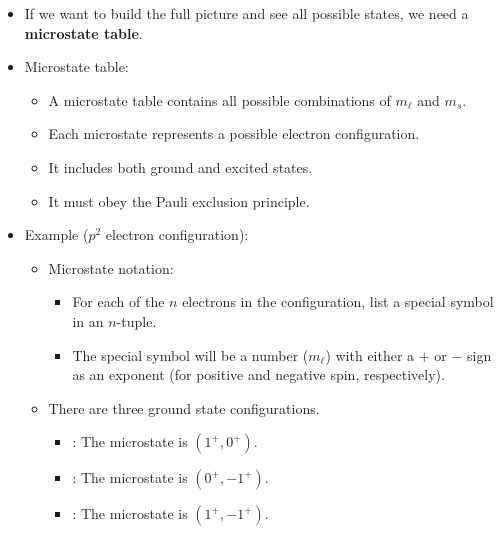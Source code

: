 \documentclass[../notes.tex]{subfiles}
\begin{document}
\begin{itemize}
\begin{itemize}
    \end{itemize}
    \item If we want to build the full picture and see all possible states, we need a \textbf{microstate table}.
    \item Microstate table:
    \begin{itemize}
        \item A microstate table contains all possible combinations of $m_\ell$ and $m_s$.
        \item Each microstate represents a possible electron configuration.
        \item It includes both ground and excited states.
        \item It must obey the Pauli exclusion principle.
    \end{itemize}
    \item Example ($p^2$ electron configuration):
    \begin{itemize}
        \item Microstate notation:
        \begin{itemize}
            \item For each of the $n$ electrons in the configuration, list a special symbol in an $n$-tuple.
            \item The special symbol will be a number ($m_\ell$) with either a $+$ or $-$ sign as an exponent (for positive and negative spin, respectively).
        \end{itemize}
        \item There are three ground state configurations.
        \begin{itemize}
            \item {}: The microstate is $(1^+,0^+)$.
            \item {}: The microstate is $(0^+,-1^+)$.
            \item {}: The microstate is $(1^+,-1^+)$.

\end{itemize}
\end{itemize}
\end{itemize}
\end{document}
